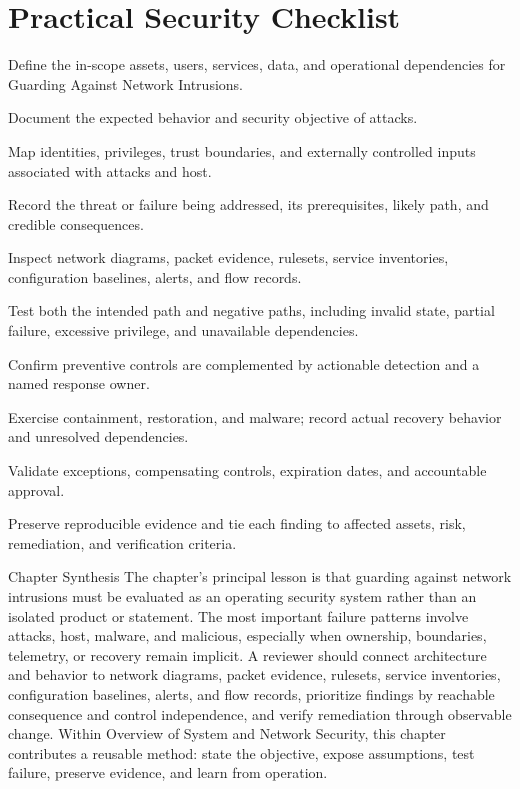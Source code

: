 \documentclass[11pt,letterpaper]{article}
\begin{document}
\section*{Practical Security Checklist}
\begin{CornellChecklist}
\item Define the in-scope assets, users, services, data, and operational dependencies for Guarding Against Network Intrusions.
\item Document the expected behavior and security objective of attacks.
\item Map identities, privileges, trust boundaries, and externally controlled inputs associated with attacks and host.
\item Record the threat or failure being addressed, its prerequisites, likely path, and credible consequences.
\item Inspect network diagrams, packet evidence, rulesets, service inventories, configuration baselines, alerts, and flow records.
\item Test both the intended path and negative paths, including invalid state, partial failure, excessive privilege, and unavailable dependencies.
\item Confirm preventive controls are complemented by actionable detection and a named response owner.
\item Exercise containment, restoration, and malware; record actual recovery behavior and unresolved dependencies.
\item Validate exceptions, compensating controls, expiration dates, and accountable approval.
\item Preserve reproducible evidence and tie each finding to affected assets, risk, remediation, and verification criteria.
\end{CornellChecklist}
\begin{CornellSummaryBox}{Chapter Synthesis}
The chapter's principal lesson is that guarding against network intrusions must be evaluated as an operating security system rather than an isolated product or statement. The most important failure patterns involve attacks, host, malware, and malicious, especially when ownership, boundaries, telemetry, or recovery remain implicit. A reviewer should connect architecture and behavior to network diagrams, packet evidence, rulesets, service inventories, configuration baselines, alerts, and flow records, prioritize findings by reachable consequence and control independence, and verify remediation through observable change. Within Overview of System and Network Security, this chapter contributes a reusable method: state the objective, expose assumptions, test failure, preserve evidence, and learn from operation.
\end{CornellSummaryBox}
\end{document}
